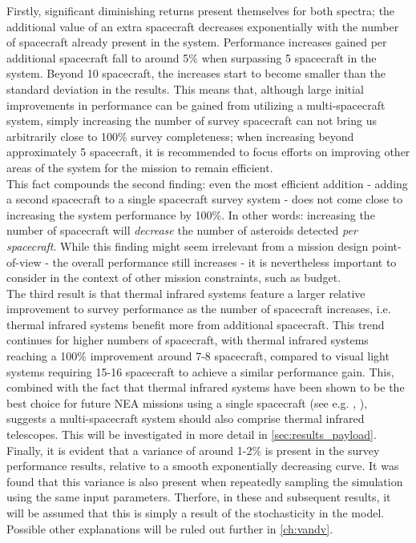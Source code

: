 Firstly, significant diminishing returns present themselves for both spectra; the additional value of an extra spacecraft decreases exponentially with the number of spacecraft already present in the system. Performance increases gained per additional spacecraft fall to around 5\% when surpassing 5 spacecraft in the system. Beyond 10 spacecraft, the increases start to become smaller than the standard deviation in the results. This means that, although large initial improvements in performance can be gained from utilizing a multi-spacecraft system, simply increasing the number of survey spacecraft can not bring us arbitrarily close to 100\% survey completeness; when increasing beyond approximately 5 spacecraft, it is recommended to focus efforts on improving other areas of the system for the mission to remain efficient. \\

This fact compounds the second finding: even the most efficient addition - adding a second spacecraft to a single spacecraft survey system - does not come close to increasing the system performance by 100\%. In other words: increasing the number of spacecraft will \textit{decrease} the number of asteroids detected \textit{per spacecraft}. While this finding might seem irrelevant from a mission design point-of-view - the overall performance still increases - it is nevertheless important to consider in the context of other mission constraints, such as budget. \\

The third result is that thermal infrared systems feature a larger relative improvement to survey performance as the number of spacecraft increases, i.e. thermal infrared systems benefit more from additional spacecraft. This trend continues for higher numbers of spacecraft, with thermal infrared systems reaching a 100\% improvement around 7-8 spacecraft, compared to visual light systems requiring 15-16 spacecraft to achieve a similar performance gain. This, combined with the fact that thermal infrared systems have been shown to be the best choice for future NEA missions using a single spacecraft (see e.g. \cite{2017NEOSDT}, \cite{ThesisOlga}), suggests a multi-spacecraft system should also comprise thermal infrared telescopes. This will be investigated in more detail in \autoref{sec:results_payload}.\\

Finally, it is evident that a variance of around 1-2\% is present in the survey performance results, relative to a smooth exponentially decreasing curve. It was found that this variance is also present when repeatedly sampling the simulation using the same input parameters. Therfore, in these and subsequent results, it will be assumed that this is simply a result of the stochasticity in the model. Possible other explanations will be ruled out further in \autoref{ch:vandv}.

